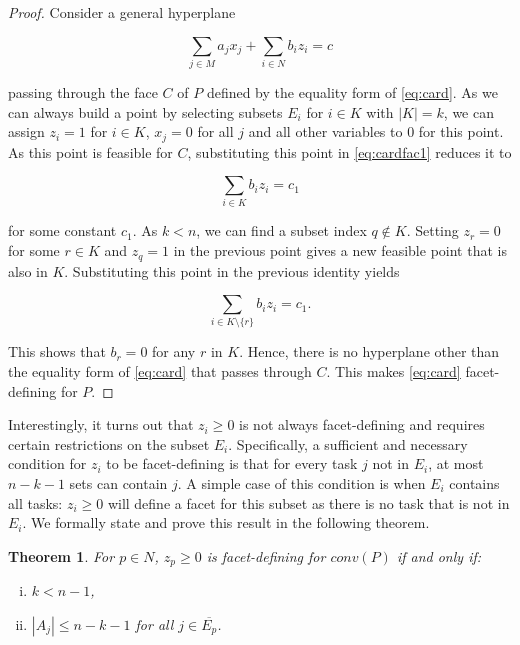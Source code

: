 \documentclass[12pt]{article}
\renewcommand{\v}[1]{\overline{#1}}
\newtheorem{thm}{Theorem}
\begin{document}
\begin{proof}
Consider a general hyperplane

\begin{equation} \label{eq:cardfac1}
\sum_{j \in M} a_j x_j + \sum_{i \in N} b_i z_i = c
\end{equation}

passing through the face $C$ of $P$ defined by the equality form of \eqref{eq:card}. As we can always build a point by selecting subsets $E_i$ for $i \in K$ with $|K| = k$, we can assign $z_i = 1$ for $i \in K$, $x_j = 0$ for all $j$ and all other variables to $0$ for this point. As this point is feasible for $C$, substituting this point in \eqref{eq:cardfac1} reduces it to

\[ \sum_{i \in K} b_i z_i = c_1\]

for some constant $c_1$. As $k < n$, we can find a subset index $q \notin K$. Setting $z_r = 0$ for some $r \in K$ and $z_q = 1$ in the previous point gives a new feasible point that is also in $K$. Substituting this point in the previous identity yields

\[ \sum_{i \in K \setminus \{r\}} b_i z_i = c_1.\]

This shows that $b_r = 0$ for any $r$ in $K$. Hence, there is no hyperplane other than the equality form of \eqref{eq:card} that passes through $C$. This makes \eqref{eq:card} facet-defining for $P$.
\end{proof}

Interestingly, it turns out that $z_i \geq 0$ is not always facet-defining and requires certain restrictions on the subset $E_i$. Specifically, a sufficient and necessary condition for $z_i$ to be facet-defining is that for every task $j$ not in $E_i$, at most $n-k-1$ sets can contain $j$. A simple case of this condition is when $E_i$ contains all tasks: $z_i \geq 0$ will define a facet for this subset as there is no task that is not in $E_i$. We formally state and prove this result in the following theorem.

\begin{thm} \label{thm:zfac}
For $p \in N$, $z_p \geq 0$ is facet-defining for $conv(P)$ if and only if:
\begin{enumerate}[(i)]
	\item $k < n-1$,
	\item $|A_j| \leq n - k - 1$ for all $j \in \v{E_p}$.
\end{enumerate}
\end{thm}
\end{document}
